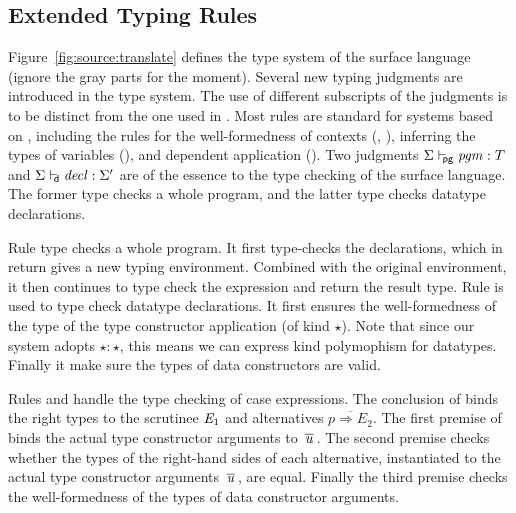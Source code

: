 \subsection{Extended Typing Rules}

Figure~\ref{fig:source:translate} defines the type system of the
surface language (ignore the gray parts for the moment). Several new
typing judgments are introduced in the type system. The use of
different subscripts of the judgments is to be distinct from the one
used in \name. Most rules are standard for systems based on \coc,
including the rules for the well-formedness of contexts
(, ), inferring the types of
variables (), and dependent application
(). Two judgments $ \Sigma  \vdash_{\!\!\mathsf{pg} }  \mathit{pgm}  :  T $ and
$ \Sigma  \vdash_{\!\!\mathsf{d} }  \mathit{decl}  :  \Sigma' $ are of the essence to the type checking of the
surface language. The former type checks a whole program, and the
latter type checks datatype declarations.

Rule  type checks a whole program. It first
type-checks the declarations, which in return gives a new typing
environment. Combined with the original environment, it then continues
to type check the expression and return the result type. Rule
 is used to type check datatype declarations. It
first ensures the well-formedness of the type of the type constructor
application (of kind $\star$). Note that since our system adopts
$\star : \star$, this means we can express kind polymophism for
datatypes. Finally it make sure the types of data constructors are
valid.

Rules  and  handle the type
checking of case expressions. The conclusion of 
binds the right types to the scrutinee $\mathit{E_{{\mathrm{1}}}}$ and alternatives
$\overline{p \Rightarrow E_2}$. The first premise of
 binds the actual type constructor arguments to
$\,\overline{  \mathit{u}  }\,$. The second premise checks whether the types of the
right-hand sides of each alternative, instantiated to the actual type
constructor arguments $\,\overline{  \mathit{u}  }\,$, are equal. Finally the third
premise checks the well-formedness of the types of data constructor
arguments.   

